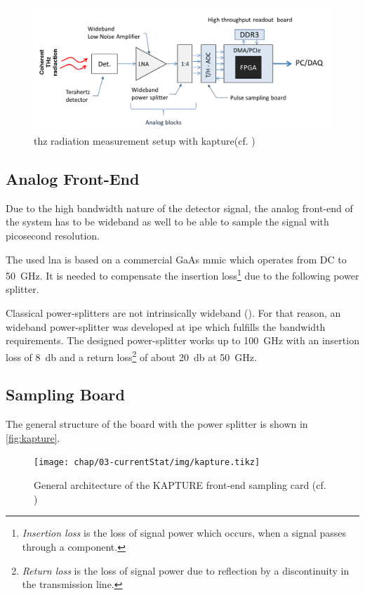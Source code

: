 \begin{figure}[tbh]
	\centering
	\includegraphics[width = \textwidth]{chap/03-currentStat/img/thz_chain}
	\caption[THz measurement with KAPTURE]{\gls{thz} radiation measurement setup with \gls{kapture}(cf. \cite{caselle2014})}
	\label{fig:thz_chain}
\end{figure}

\subsection{Analog Front-End}
Due to the high bandwidth nature of the detector signal, the analog front-end of the system has to be wideband as well to be able to sample the signal with picosecond resolution. 

The used \gls{lna} is based on a commercial GaAs \gls{mmic} which operates from DC to \SI{50}{\giga \hertz}. It is needed to compensate the insertion loss\footnote{\textit{Insertion loss} is the loss of signal power which occurs, when a signal passes through a component.} due to the following power splitter. %

Classical power-splitters are not intrinsically wideband (\cite{caselle2014}). For that reason, an wideband power-splitter was developed at \gls{ipe} which fulfills the bandwidth requirements. The designed power-splitter works up to \SI{100}{\giga \hertz} with an insertion loss of \SI{8}{\decibel} and a return loss\footnote{\textit{Return loss} is the loss of signal power due to reflection by a discontinuity in the transmission line.} of about \SI{20}{\decibel} at \SI{50}{\giga \hertz}.\cite{caselle2014}

\subsection{Sampling Board}
The general structure of the board with the power splitter is shown in \autoref{fig:kapture}. 
\begin{figure}[tbh]
	\centering
	\texttt{[image: chap/03-currentStat/img/kapture.tikz]}
	\caption{General architecture of the KAPTURE front-end sampling card (cf. \cite[p.2]{caselleKAP})}
	\label{fig:kapture}
\end{figure}

